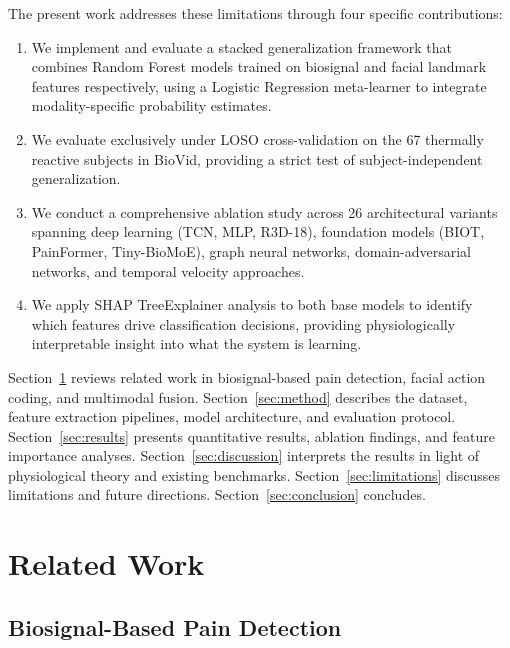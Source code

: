 \documentclass[10pt, twocolumn]{article}
\begin{document}
The present work addresses these limitations through four specific contributions:

\begin{enumerate}
  \item We implement and evaluate a stacked generalization framework that combines Random
        Forest models trained on biosignal and facial landmark features respectively, using
        a Logistic Regression meta-learner to integrate modality-specific probability
        estimates.
  \item We evaluate exclusively under LOSO cross-validation on the 67 thermally reactive
        subjects in BioVid, providing a strict test of subject-independent generalization.
  \item We conduct a comprehensive ablation study across 26 architectural variants spanning
        deep learning (TCN, MLP, R3D-18), foundation models (BIOT, PainFormer, Tiny-BioMoE),
        graph neural networks, domain-adversarial networks, and temporal velocity approaches.
  \item We apply SHAP TreeExplainer analysis to both base models to identify which features
        drive classification decisions, providing physiologically interpretable insight into
        what the system is learning.
\end{enumerate}

Section~\ref{sec:related} reviews related work in biosignal-based pain detection, facial
action coding, and multimodal fusion. Section~\ref{sec:method} describes the dataset,
feature extraction pipelines, model architecture, and evaluation protocol.
Section~\ref{sec:results} presents quantitative results, ablation findings, and feature
importance analyses. Section~\ref{sec:discussion} interprets the results in light of
physiological theory and existing benchmarks. Section~\ref{sec:limitations} discusses
limitations and future directions. Section~\ref{sec:conclusion} concludes.

\section{Related Work}
\label{sec:related}

\subsection{Biosignal-Based Pain Detection}
\end{document}

